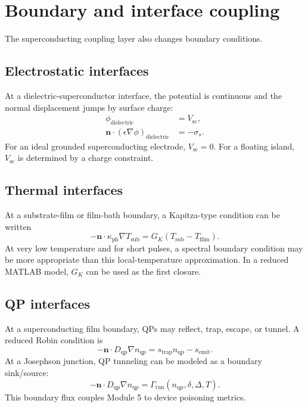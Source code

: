 \documentclass[11pt]{article}
\newcommand{\nnormal}{\bm{n}}
\newcommand{\phiE}{\phi}
\newcommand{\kappaph}{\kappa_{\mathrm{ph}}}
\newcommand{\DeltaSC}{\Delta}
\newcommand{\nqp}{n_{\mathrm{qp}}}
\newcommand{\Dqp}{D_{\mathrm{qp}}}
\begin{document}
\section{Boundary and interface coupling}

The superconducting coupling layer also changes boundary conditions.

\subsection{Electrostatic interfaces}

At a dielectric-superconductor interface, the potential is continuous and the normal displacement jumps by surface charge:
\begin{align}
\phiE_{\mathrm{dielectric}}&=V_{\mathrm{sc}},\\
\nnormal\cdot(\epsilon\nabla\phiE)_{\mathrm{dielectric}}&=-\sigma_s.
\end{align}
For an ideal grounded superconducting electrode, \(V_{\mathrm{sc}}=0\). For a floating island, \(V_{\mathrm{sc}}\) is determined by a charge constraint.

\subsection{Thermal interfaces}

At a substrate-film or film-bath boundary, a Kapitza-type condition can be written
\begin{equation}
-\nnormal\cdot\kappaph\nabla T_{\mathrm{sub}}
=G_K(T_{\mathrm{sub}}-T_{\mathrm{film}}).
\end{equation}
At very low temperature and for short pulses, a spectral boundary condition may be more appropriate than this local-temperature approximation. In a reduced MATLAB model, \(G_K\) can be used as the first closure.

\subsection{QP interfaces}

At a superconducting film boundary, QPs may reflect, trap, escape, or tunnel. A reduced Robin condition is
\begin{equation}
-\nnormal\cdot \Dqp\nabla\nqp=s_{\mathrm{trap}}\nqp-s_{\mathrm{emit}}.
\end{equation}
At a Josephson junction, QP tunneling can be modeled as a boundary sink/source:
\begin{equation}
-\nnormal\cdot \Dqp\nabla\nqp = \Gamma_{\mathrm{tun}}(\nqp,\delta,\DeltaSC,T).
\end{equation}
This boundary flux couples Module 5 to device poisoning metrics.
\end{document}
